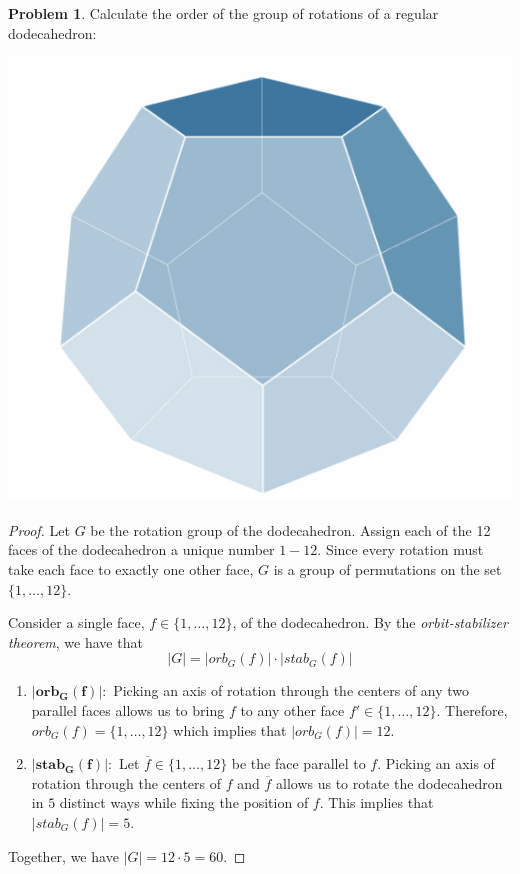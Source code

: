 \documentclass[12pt,reqno]{article}
\theoremstyle{plain}
\theoremstyle{definition}
\newtheorem{problem}{Problem}
\begin{document}
\newpage
    

\begin{problem} 
    Calculate the order of the group of rotations of a regular dodecahedron:
    \begin{center}
        \includegraphics[height = 1.6 in]{Screenshot 2023-03-03 at 1.12.39 PM.png}
    \end{center}
\end{problem}

\begin{proof}
    Let \(G\) be the rotation group of the dodecahedron. Assign each of the 12 faces of the dodecahedron a unique number \(1-12\).
    Since every rotation must take each face to exactly one other face, \(G\) is a group of permutations
    on the set \(\{1,\ldots,12\}\). 
    
    Consider a single face, \(f\in\{1,\ldots,12\}\), of the dodecahedron.
    By the \emph{orbit-stabilizer theorem}, we have that 
    \[|G|=|orb_G(f)|\cdot |stab_G(f)|\]
    \begin{enumerate}
        \item \(\mathbf{|orb_G(f)|}:\) Picking an axis of rotation through the centers of any two
        parallel faces allows us to bring \(f\) to any other face \(f'\in\{1,\ldots,12\}\).
        Therefore, \(orb_G(f)=\{1,\ldots,12\}\) which implies that \(|orb_G(f)|=12\).
        \item \(\mathbf{|stab_G(f)|}:\) Let \(\overline{f}\in \{1,\ldots,12\}\) be the face parallel to \(f\). 
        Picking an axis of rotation through the centers of \(f\) and \(\overline{f}\) allows
        us to rotate the dodecahedron in \(5\) distinct ways while fixing the position of \(f\). 
        This implies that \(|stab_G(f)|=5\).
    \end{enumerate}
    Together, we have \(|G|=12\cdot 5=60\).
\end{proof}

\newpage
    
\end{document}
